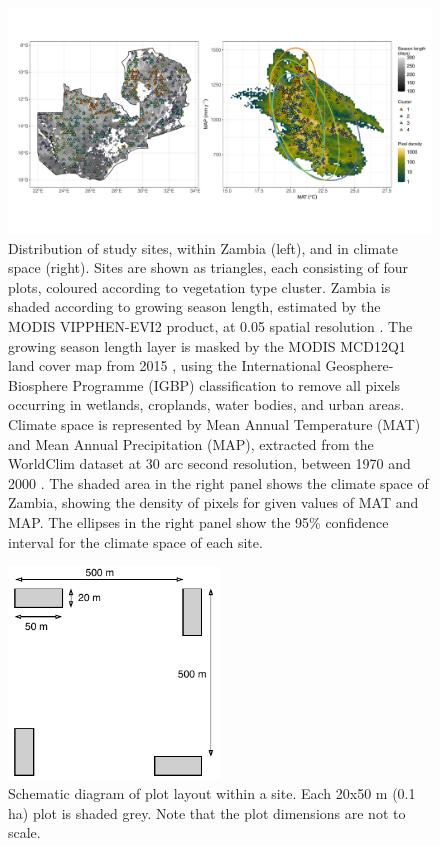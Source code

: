\begin{refsection}
\begin{figure}[tb]
	\includegraphics[width=\textwidth]{img/plot_loc_clim}
	\caption[Map of study sites in Zambia]{Distribution of study sites, within Zambia (left), and in climate space (right). Sites are shown as triangles, each consisting of four plots, coloured according to vegetation type cluster. Zambia is shaded according to growing season length, estimated by the MODIS VIPPHEN-EVI2 product, at 0.05\textdegree{} spatial resolution \citep{VIPPHEN}. The growing season length layer is masked by the MODIS MCD12Q1 land cover map from 2015 \citep{MCD12Q1}, using the International Geosphere-Biosphere Programme (IGBP) classification to remove all pixels occurring in wetlands, croplands, water bodies, and urban areas. Climate space is represented by Mean Annual Temperature (MAT) and Mean Annual Precipitation (MAP), extracted from the WorldClim dataset at 30 arc second resolution, between 1970 and 2000 \citep{Fick2017}. The shaded area in the right panel shows the climate space of Zambia, showing the density of pixels for given values of MAT and MAP. The ellipses in the right panel show the 95\% confidence interval for the climate space of each site.} 
	\label{phen:plot_loc_clim}
\end{figure}

\begin{landscape}

\end{landscape}

\begin{figure}[tb]
	\includegraphics[width=0.5\textwidth]{img/schematic}
	\caption[Schematic diagram of plot layout within a site]{Schematic diagram of plot layout within a site. Each 20x50 m (0.1 ha) plot is shaded grey. Note that the plot dimensions are not to scale.}
	\label{phen:schematic}
\end{figure}


\end{refsection}
